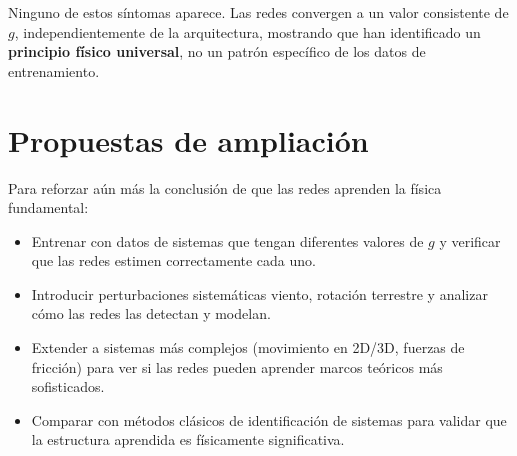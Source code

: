 \documentclass[11pt]{article}
\begin{document}
	Ninguno de estos síntomas aparece. Las redes convergen a un valor consistente de $g$, independientemente de la arquitectura, mostrando que han identificado un \textbf{principio físico universal}, no un patrón específico de los datos de entrenamiento.
	
	\section{Propuestas de ampliación}
	Para reforzar aún más la conclusión de que las redes aprenden la física fundamental:
	\begin{itemize}
		\item Entrenar con datos de sistemas que tengan diferentes valores de $g$ y verificar que las redes estimen correctamente cada uno.
		\item Introducir perturbaciones sistemáticas viento, rotación terrestre y analizar cómo las redes las detectan y modelan.
		\item Extender a sistemas más complejos (movimiento en 2D/3D, fuerzas de fricción) para ver si las redes pueden aprender marcos teóricos más sofisticados.
		\item Comparar con métodos clásicos de identificación de sistemas para validar que la estructura aprendida es físicamente significativa.
	\end{itemize}
	
\end{document}
